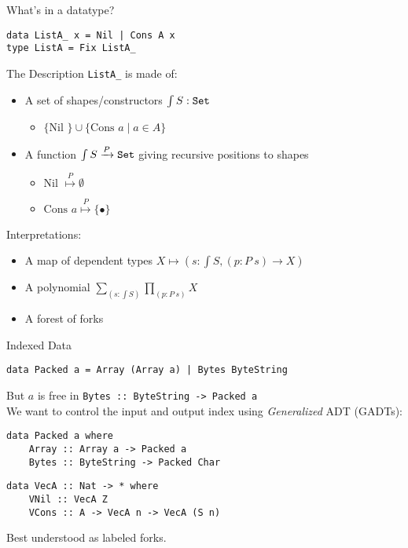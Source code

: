 \documentclass{beamer}
\newcommand{\Set}{{\tt Set }}
\newcommand{\Nil}{\mbox{Nil }}
\newcommand{\Cons}{\mbox{Cons }}
\begin{document}
\begin{frame}[fragile]{What's in a datatype?}
\begin{lstlisting}
data ListA_ x = Nil | Cons A x
type ListA = Fix ListA_
\end{lstlisting}
\pause
The \alert{Description} \lstinline+ListA_+ is made of:
\begin{itemize}
\item A set of shapes/constructors $\int S : \Set$
\begin{itemize}
\item[] $\{\Nil \} \cup \{\Cons a \mid a \in A\}$
\end{itemize}
\pause
\item A function $\int S \xrightarrow{P} \Set$ giving \alert{recursive positions} to shapes
\begin{itemize}
\item[] $\Nil \overset{P}{\mapsto} \emptyset$
\item[] $\Cons a \overset{P}{\mapsto} \{\bullet\}$
\end{itemize}
\end{itemize}

\pause
\begin{block}{Interpretations:}
\begin{itemize}
\item A map of dependent types $X \mapsto (s : \int S, (p : P~s) \to X)$
\item A polynomial $\sum_{(s : \int S)} \prod_{(p : P~s)} X$
\item A forest of forks
\end{itemize} 
\end{block}
\end{frame}

\begin{frame}[fragile]{Indexed Data}
\begin{example}
\lstinline+data Packed a = Array (Array a) | Bytes ByteString+\\
\hrulefill


But $a$ is free in \lstinline+Bytes :: ByteString -> Packed a+\\
\pause
We want to control the input and output index using \emph{Generalized} ADT (GADTs):

\begin{lstlisting}
data Packed a where
    Array :: Array a -> Packed a
    Bytes :: ByteString -> Packed Char
\end{lstlisting}
\end{example}
\pause
\begin{example}
\begin{lstlisting}
data VecA :: Nat -> * where
    VNil :: VecA Z
    VCons :: A -> VecA n -> VecA (S n)
\end{lstlisting}
\end{example}
\pause
Best understood as labeled forks.
\end{frame}
\end{document}
